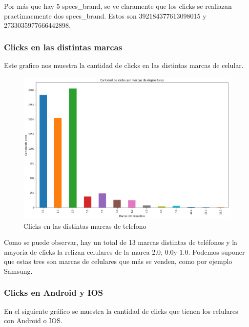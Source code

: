 \documentclass[a4paper, 12pt]{article}
\newcommand\tab[1][1cm]{\hspace*{#1}}
\begin{document}
		\tab Por más que hay 5 specs\_brand, se ve claramente que los clicks se realiazan practimacmente dos specs\_brand. Estos son 392184377613098015 y 2733035977666442898.
		

	\subsubsection{Clicks en las distintas marcas}
		\tab Este grafico nos muestra la cantidad de clicks en las distintas marcas de celular.

		\FloatBarrier
		\begin{figure}[h]
			\centering
			\includegraphics[width=\textwidth]{images/clicks/clicks_brand.png}
			\caption{Clicks en las distintas marcas de telefono}
		\end{figure}
		\FloatBarrier

		\tab Como se puede observar, hay un total de 13 marcas distintas de teléfonos y la mayoria de clicks la relizan celulares de la marca 2.0, 0.0y 1.0. Podemos suponer que estas tres son marcas de celulares que más se venden, como por ejemplo Samsung.

	\subsubsection{Clicks en Android y IOS}
		\tab En el siguiente gráfico se muestra la cantidad de clicks que tienen los celulares con Android o IOS.
\end{document}
